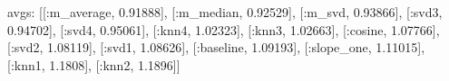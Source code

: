   avgs:
  [[:m_average, 0.91888],
   [:m_median, 0.92529],
   [:m_svd, 0.93866],
   [:svd3, 0.94702],
   [:svd4, 0.95061],
   [:knn4, 1.02323],
   [:knn3, 1.02663],
   [:cosine, 1.07766],
   [:svd2, 1.08119],
   [:svd1, 1.08626],
   [:baseline, 1.09193],
   [:slope_one, 1.11015],
   [:knn1, 1.1808],
   [:knn2, 1.1896]]

